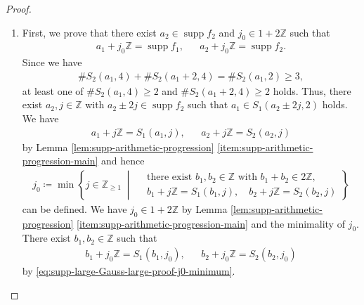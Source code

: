 \documentclass[12pt]{article}
\theoremstyle{definition}
\theoremstyle{remark}
\numberwithin{equation}{section}
\numberwithin{figure}{section}
\numberwithin{table}{section}
\DeclareMathOperator{\supp}{supp}
\begin{document}
\begin{proof}

\begin{enumerate}
    \item 

    First, we prove that there exist $ a_2 \in \supp f_2 $ and $ j_0 \in 1 + 2 \mathbb{ Z } $ such that
    \begin{align}
        a_1 + j_0 \mathbb{ Z } = \supp f_1, & &
        a_2 + j_0 \mathbb{ Z } = \supp f_2. \label{eq:supp-large-Gauss-large-proof-supp}
    \end{align}
    Since we have
    \begin{align}
        \# S_2 ( a_1 , 4 ) + \# S_2 ( a_1 + 2 , 4 ) = \# S_2 ( a_1 , 2 ) \geq 3,
    \end{align}
    at least one of $ \# S_2 ( a_1 , 4 ) \geq 2 $ and $ \# S_2 ( a_1 + 2 , 4 ) \geq 2 $ holds.
Thus, there exist $ a_2 , j \in \mathbb{ Z } $ with $ a_2 \pm 2 j \in \supp f_2 $ such that $ a_1 \in S_1 ( a_2 \pm 2 j , 2 ) $ holds.
We have
\begin{align}
    a_1 + j \mathbb{ Z } = S_1 ( a_1 , j ) , & &
    a_2 + j \mathbb{ Z } = S_2 ( a_2 , j )
\end{align}
by Lemma \ref{lem:supp-arithmetic-progression} \ref{item:supp-arithmetic-progression-main} and hence
\begin{align}
    j_0 
    \coloneqq \min \left\{ j\in\mathbb Z_{\geq1} \; \middle| \;
  \begin{aligned}
  & \text{there exist } b_1,b_2\in\mathbb Z
  \text{ with } b_1+b_2\in2\mathbb Z,\\
  & b_1+j\mathbb Z=S_1(b_1,j), \quad
  b_2+j\mathbb Z=S_2(b_2,j)
  \end{aligned}
\right\} \label{eq:supp-large-Gauss-large-proof-j0-minimum}
\end{align}
can be defined.
We have $ j_0 \in 1 + 2 \mathbb{ Z } $ by Lemma \ref{lem:supp-arithmetic-progression} \ref{item:supp-arithmetic-progression-main} and the minimality of $ j_0 $.
There exist $ b_1 , b_2 \in \mathbb{ Z } $ such that
\begin{align}
    b_1 + j_0 \mathbb{ Z } = S_1 ( b_1 , j_0 ), & &
    b_2 + j_0 \mathbb{ Z } = S_2 ( b_2 , j_0 ) \label{eq:supp-large-Gauss-large-proof-b1-b2-define}
\end{align}
by \eqref{eq:supp-large-Gauss-large-proof-j0-minimum}.


\end{enumerate}
\end{proof}
\end{document}
